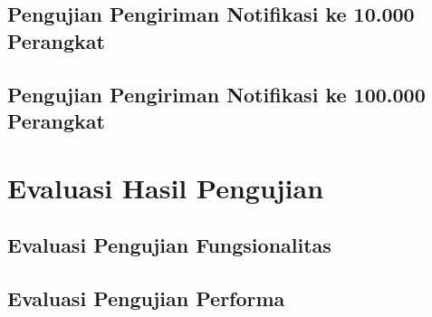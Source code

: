 \subsection{Pengujian Pengiriman Notifikasi ke 10.000 Perangkat}

\subsection{Pengujian Pengiriman Notifikasi ke 100.000 Perangkat}

\section{Evaluasi Hasil Pengujian}

\subsection{Evaluasi Pengujian Fungsionalitas}

\subsection{Evaluasi Pengujian Performa}
